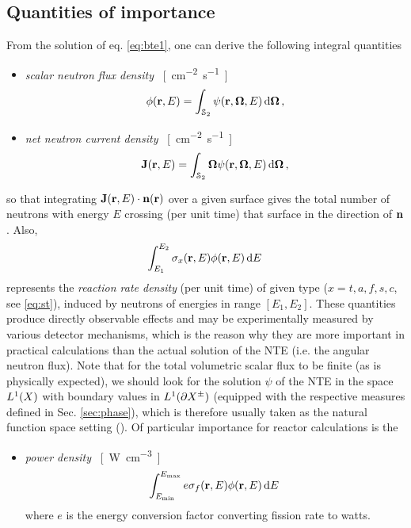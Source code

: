 \subsection{Quantities of importance}
From the solution of eq. \eqref{eq:bte1}, one can derive the following integral quantities
\begin{itemize}
  \item \textit{scalar neutron flux density} \SI{}{[cm^{-2}.s^{-1}]}
  \begin{equation}\label{eq:scalar_flux}
    \phi(\br, E) = \intA{\psi(\br,\bomega,E)},
  \end{equation}
  \item \textit{net neutron current density} \SI{}{[cm^{-2}.s^{-1}]}
	\begin{equation}\label{eq:bJ}
		\bJ(\br, E)	= \intA{\bomega\psi(\br,\bomega,E)},
	\end{equation}
\end{itemize}
so that integrating $\bJ(\br,E)\cdot\bn(\br)$ over a given surface 
gives the total number of neutrons with energy $E$ crossing (per unit time) that surface in the direction of 
$\bn$. Also,
\begin{equation}\label{eq:rr}
  \intE{E_1}{E_2}{\sigma_x(\br, E) \phi(\br, E)}
\end{equation}
represents the \textit{reaction rate density} (per unit time) of given type ($x = t,a,f,s,c$, see \eqref{eq:st}), 
induced by neutrons of energies in range $[E_1, E_2]$. 
These quantities produce directly observable effects and may be experimentally measured
by various detector mechanisms, which is the reason why they are more important in practical calculations than the 
actual solution of the NTE (i.e. the angular neutron flux). Note that for the total volumetric scalar flux to be finite 
(as is physically expected), we should look for the solution $\psi$ of the NTE in the space $\Lp[1](X)$ with boundary 
values in $\Lp[1](\pX[\pm])$ (equipped with the respective measures defined in Sec. \ref{sec:phase}), which is 
therefore usually taken as the natural function space setting (\cite{DautrayLions}).
Of particular importance for reactor calculations is the
\begin{itemize}
  \item \textit{power density} \SI{}{[W.cm^{-3}]}
\begin{equation}\label{eq:power}
	\intE{\Emin}{\Emax}{e\sigma_f(\br, E) \phi(\br, E)}
\end{equation}
	where $e$ is the energy conversion factor converting fission rate to watts.
\end{itemize}

